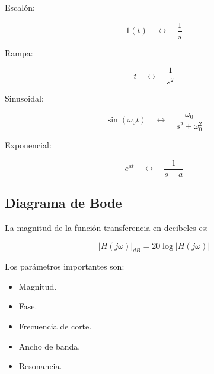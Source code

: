 \documentclass[12pt,a4paper]{article}
\begin{document}
Escalón:

\[
1(t)
\quad\longleftrightarrow\quad
\frac{1}{s}
\]

Rampa:

\[
t
\quad\longleftrightarrow\quad
\frac{1}{s^2}
\]

Sinusoidal:

\[
\sin(\omega_0t)
\quad\longleftrightarrow\quad
\frac{\omega_0}{s^2+\omega_0^2}
\]

Exponencial:

\[
e^{at}
\quad\longleftrightarrow\quad
\frac{1}{s-a}
\]

\subsection*{Diagrama de Bode}

La magnitud de la función transferencia en decibeles es:

\[
\boxed{
|H(j\omega)|_{dB}
=
20\log |H(j\omega)|
}
\]

Los parámetros importantes son:

\begin{itemize}
    \item Magnitud.
    \item Fase.
    \item Frecuencia de corte.
    \item Ancho de banda.
    \item Resonancia.
\end{itemize}
\end{document}
